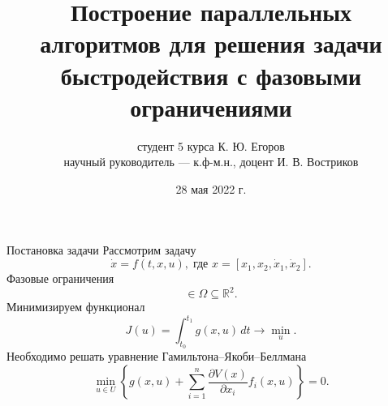 

\usepackage{adjustbox}
\usepackage{amsfonts}
\title[Курсовая работа]
    {Построение параллельных алгоритмов для решения задачи быстродействия с фазовыми ограничениями}
\author[К. Ю. Егоров]
    {студент 5 курса К. Ю. Егоров\\
    научный руководитель --- к.ф-м.н., доцент И. В. Востриков}
\date{28 мая 2022 г.}


    \maketitle
    \begin{frame}[t]{Постановка задачи}
        Рассмотрим задачу
        \begin{equation*}
            \dot x = f(t,x,u),\;\mbox{где $x = [x_1, x_2, \dot x_1, \dot x_2]$.}
        \end{equation*}
        Фазовые ограничения
        \begin{equation*}
            [x_1, x_2] \in \Omega \subseteq \mathbb{R}^2.
        \end{equation*}
        Минимизируем функционал
        \begin{equation*}
            J(u) = \int_{t_0}^{t_1}g(x, u)\,dt \to \min_u.
        \end{equation*}
        Необходимо решать уравнение Гамильтона--Якоби--Беллмана
        \begin{equation*}
            \min\limits_{u \in U}\left\{
                g(x,u) + \sum\limits_{i=1}^{n}\frac{\partial V(x)}{\partial x_i} f_i(x,u)
            \right\} = 0.
        \end{equation*}
    \end{frame}
